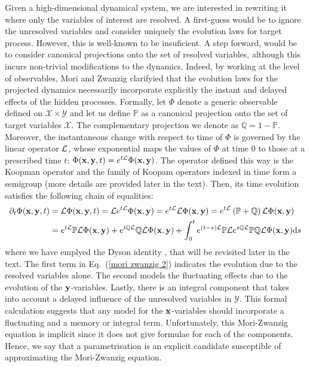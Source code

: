 \documentclass[12pt]{article}
\begin{document}
Given a high-dimensional dynamical system, we are interested in rewriting it where only the variables of interest are resolved. A first-guess would be to ignore the unresolved variables and consider uniquely the evolution laws for target process. However, this is well-known to be insuficient. A step forward, would be to consider canonical projections onto the set of resolved variables, although this incurs non-trivial modifications to the dynamics. Indeed, by working at the level of observables, Mori and Zwanzig \cite{zwanzig} clarifyied that the evolution laws for the projected dynamics necessarily incorporate explicitly the instant and delayed effects of the hidden processes. Formally, let $\Phi$ denote a generic observable defined on $\mathcal{X}\times \mathcal{Y}$ and let us define $\mathbb{P}$ as a canonical projection onto the set of target variables $\mathcal{X}$. The complementary projection we denote as $\mathbb{Q}=1 - \mathbb{P}$. Moreover, the instantaneous change with respect to time of $\Phi$ is governed by the linear operator $\mathcal{L}$, whose exponential maps the values of $\Phi$ at time $0$ to those at a prescribed time $t$: $\Phi(\mathbf{x}, \mathbf{y} , t)=e^{t\mathcal{L}}\Phi(\mathbf{x},\mathbf{y})$. The operator defined this way is the Koopman operator and the family of Koopam operators indexed in time form a semigroup (more details are provided later in the text). Then, its time evolution satisfies the following chain of equalities:
\begin{align}
\partial _t \Phi(\mathbf{x},\mathbf{y} , t) &= \mathcal{L} \Phi(\mathbf{x},\mathbf{y} , t) = \mathcal{L} e^{t\mathcal{L}}\Phi(\mathbf{x},\mathbf{y})= e^{t\mathcal{L}}\mathcal{L}\Phi(\mathbf{x},\mathbf{y})= e^{t\mathcal{L}}\left(\mathbb{P}+\mathbb{Q}\right)\mathcal{L}\Phi(\mathbf{x},\mathbf{y}) \\ \label{mori zwanzig 2} &= e^{t\mathcal{L}}\mathbb{P}\mathcal{L}\Phi(\mathbf{x},\mathbf{y}) + e^{t\mathbb{Q}\mathcal{L}}\mathbb{Q}\mathcal{L}\Phi(\mathbf{x},\mathbf{y}) + \int_{0}^{t}e^{(t-s)\mathcal{L}}\mathbb{P}\mathcal{L} e^{s\mathbb{Q}\mathcal{L}}\mathbb{P}\mathbb{Q}\mathcal{L} \Phi(\mathbf{x},\mathbf{y}) \mathrm{d} s
\end{align}
where we have emplyed the Dyson identity \cite{engelsemigroups2006}, that will be revisited later in the text. The first term in Eq.~(\ref{mori zwanzig 2}) indicates the evolution due to the resolved variables alone. The second models the fluctuating effects due to the evolution of the  $\mathbf{y}$-variables. Lastly, there is an integral component that takes into account a delayed influence of the unresolved variables in $\mathcal{Y}$. This formal calculation suggests that any model for the $\mathbf{x}$-variables should incorporate a fluctuating and a memory or integral term. Unfortunately, this Mori-Zwanzig equation is implicit since it does not give formulae for each of the components. Hence, we say that a parametrisation is an explicit candidate susceptible of approximating the Mori-Zwanzig equation.
\end{document}
